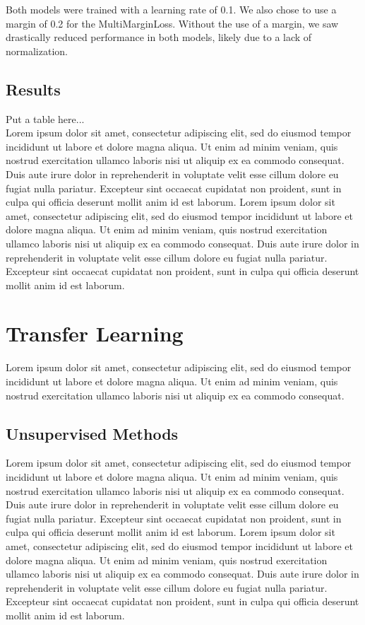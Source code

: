 \documentclass[12pt]{article}
\begin{document}
Both models were trained with a learning rate of 0.1. We also chose to use a margin of 0.2 for the MultiMarginLoss. Without the use of a margin, we saw drastically reduced performance in both models, likely due to a lack of normalization.

\subsection{Results}
Put a table here...\\

Lorem ipsum dolor sit amet, consectetur adipiscing elit, sed do eiusmod tempor incididunt ut labore et dolore magna aliqua. Ut enim ad minim veniam, quis nostrud exercitation ullamco laboris nisi ut aliquip ex ea commodo consequat. Duis aute irure dolor in reprehenderit in voluptate velit esse cillum dolore eu fugiat nulla pariatur. Excepteur sint occaecat cupidatat non proident, sunt in culpa qui officia deserunt mollit anim id est laborum. Lorem ipsum dolor sit amet, consectetur adipiscing elit, sed do eiusmod tempor incididunt ut labore et dolore magna aliqua. Ut enim ad minim veniam, quis nostrud exercitation ullamco laboris nisi ut aliquip ex ea commodo consequat. Duis aute irure dolor in reprehenderit in voluptate velit esse cillum dolore eu fugiat nulla pariatur. Excepteur sint occaecat cupidatat non proident, sunt in culpa qui officia deserunt mollit anim id est laborum.


\section{Transfer Learning}
Lorem ipsum dolor sit amet, consectetur adipiscing elit, sed do eiusmod tempor incididunt ut labore et dolore magna aliqua. Ut enim ad minim veniam, quis nostrud exercitation ullamco laboris nisi ut aliquip ex ea commodo consequat.

\subsection{Unsupervised Methods}
Lorem ipsum dolor sit amet, consectetur adipiscing elit, sed do eiusmod tempor incididunt ut labore et dolore magna aliqua. Ut enim ad minim veniam, quis nostrud exercitation ullamco laboris nisi ut aliquip ex ea commodo consequat. Duis aute irure dolor in reprehenderit in voluptate velit esse cillum dolore eu fugiat nulla pariatur. Excepteur sint occaecat cupidatat non proident, sunt in culpa qui officia deserunt mollit anim id est laborum. Lorem ipsum dolor sit amet, consectetur adipiscing elit, sed do eiusmod tempor incididunt ut labore et dolore magna aliqua. Ut enim ad minim veniam, quis nostrud exercitation ullamco laboris nisi ut aliquip ex ea commodo consequat. Duis aute irure dolor in reprehenderit in voluptate velit esse cillum dolore eu fugiat nulla pariatur. Excepteur sint occaecat cupidatat non proident, sunt in culpa qui officia deserunt mollit anim id est laborum.
\end{document}
